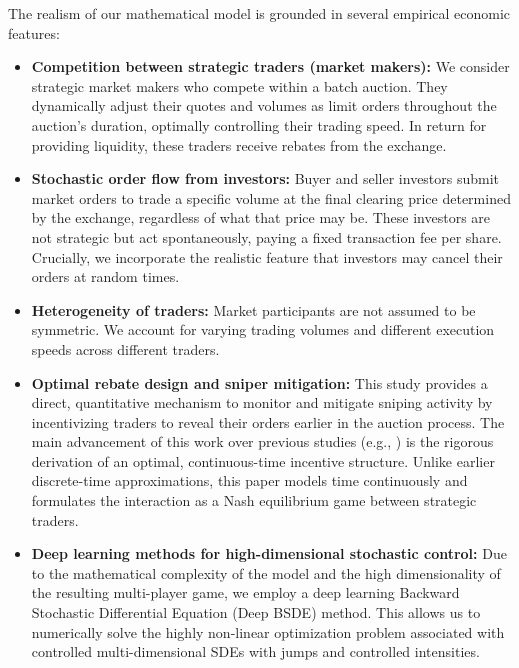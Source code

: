 \documentclass[12pt]{article}
\begin{document}
The realism of our mathematical model is grounded in several empirical economic features:
\begin{itemize}
    \item \textbf{Competition between strategic traders (market makers):} We consider strategic market makers who compete within a batch auction. They dynamically adjust their quotes and volumes as limit orders throughout the auction's duration, optimally controlling their trading speed. In return for providing liquidity, these traders receive rebates from the exchange.
    \item \textbf{Stochastic order flow from investors:} Buyer and seller investors submit market orders to trade a specific volume at the final clearing price determined by the exchange, regardless of what that price may be. These investors are not strategic but act spontaneously, paying a fixed transaction fee per share. Crucially, we incorporate the realistic feature that investors may cancel their orders at random times.
    \item \textbf{Heterogeneity of traders:} Market participants are not assumed to be symmetric. We account for varying trading volumes and different execution speeds across different traders.
    \item \textbf{Optimal rebate design and sniper mitigation:} This study provides a direct, quantitative mechanism to monitor and mitigate sniping activity by incentivizing traders to reveal their orders earlier in the auction process. The main advancement of this work over previous studies (e.g., \cite{mastrolia2024clearing}) is the rigorous derivation of an optimal, continuous-time incentive structure. Unlike earlier discrete-time approximations, this paper models time continuously and formulates the interaction as a Nash equilibrium game between strategic traders.
    \item \textbf{Deep learning methods for high-dimensional stochastic control:} Due to the mathematical complexity of the model and the high dimensionality of the resulting multi-player game, we employ a deep learning Backward Stochastic Differential Equation (Deep BSDE) method. This allows us to numerically solve the highly non-linear optimization problem associated with controlled multi-dimensional SDEs with jumps and controlled intensities.
\end{itemize}

\bigskip
\end{document}
